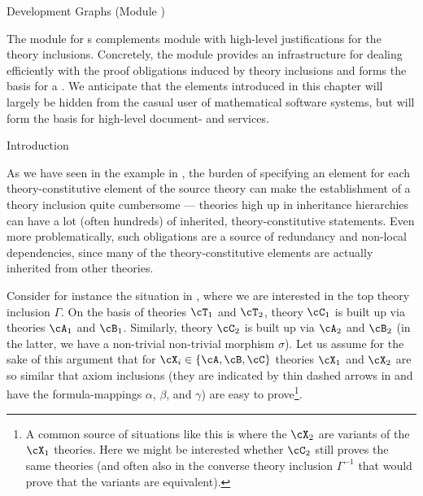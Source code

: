 \begin{omgroup}[id=complex-theories,short=Complex Theories,
                            creators=miko,contributors=frabe]
\begin{omgroup}[id=development-graphs,short=Development Graphs]{Development Graphs (Module
  {})}
\begin{module}[id=dgraph]
  
The {\omdoc} module {} for {s} complements
module {} with high-level justifications for the theory inclusions.
Concretely, the module provides an infrastructure for dealing efficiently with the proof
obligations induced by theory inclusions and forms the basis for a
. We anticipate that the elements
introduced in this chapter will largely be hidden from the casual user of mathematical
software systems, but will form the basis for high-level document- and
{} services.

\begin{omgroup}[id=dg-intro,short=Introduction]{Introduction}

As we have seen in the example in {}, the burden of specifying
an {} element for each theory-constitutive element of the source
theory can make the establishment of a theory inclusion quite cumbersome --- theories high
up in inheritance hierarchies can have a lot (often hundreds) of inherited,
theory-constitutive statements.  Even more problematically, such obligations are a source
of redundancy and non-local dependencies, since many of the theory-constitutive elements
are actually inherited from other theories.
  
  Consider for instance the situation in {}, where we are interested
  in the top theory inclusion $\Gamma$. On the basis of theories $\cT_1$ and $\cT_2$,
  theory $\cC_1$ is built up via theories $\cA_1$ and $\cB_1$.  Similarly, theory $\cC_2$
  is built up via $\cA_2$ and $\cB_2$ (in the latter, we have a non-trivial non-trivial
  morphism $\sigma$).  Let us assume for the sake of this argument that for
  $\cX_i\in\{\cA,\cB,\cC\}$ theories $\cX_1$ and $\cX_2$ are so similar that axiom
  inclusions (they are indicated by thin dashed arrows in {} and have
  the formula-mappings $\alpha$, $\beta$, and $\gamma$) are easy to prove\footnote{A
    common source of situations like this is where the $\cX_2$ are variants of the $\cX_1$
    theories. Here we might be interested whether $\cC_2$ still proves the same theories
    (and often also in the converse theory inclusion $\Gamma^{-1}$ that would prove that
    the variants are equivalent).}.


\end{omgroup}
\end{module}
\end{omgroup}
\end{omgroup}
